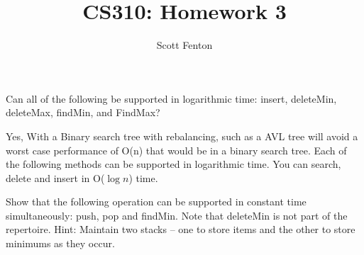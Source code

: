 \documentclass[10pt]{article}
\newenvironment{exercise}[2][Exercise]{\begin{trivlist}
\item[\hskip \labelsep {\bfseries #1}\hskip \labelsep {\bfseries #2.}]}{\end{trivlist}}
\newenvironment{solution}[2][Solution]{\begin{trivlist}
\item[\hskip \labelsep {\bfseries #1}\hskip \labelsep {\bfseries #2.}]}{\end{trivlist}}
\theoremstyle{definition}
\begin{document}
 
 
 
\title{CS310: Homework 3}%
\author{Scott Fenton\\ %
} %
 
\maketitle
 
\begin{exercise}{(1)} %
Can all of the following be supported in logarithmic time: insert, deleteMin, deleteMax, findMin, and FindMax?
\end{exercise}
 
\begin{solution}{(1)}
Yes, With a Binary search tree with rebalancing, such as a AVL tree will avoid a worst case performance of O(n) that would be in a binary search tree. Each of the following methods can be supported in logarithmic time. You can search, delete and insert in O($\log n$) time.
\end{solution}
 
\begin{exercise}{(2)} %
Show that the following operation can be supported in constant time simultaneously: push, pop and findMin. Note that deleteMin is not part of the repertoire. Hint: Maintain two stacks – one to store items and the other to store minimums as they occur.
\end{exercise}
\end{document}
